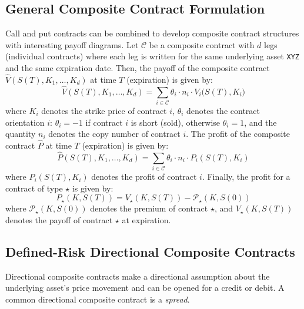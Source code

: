 \documentclass[11pt]{article}
\theoremstyle{definition}
\begin{document}
\subsection{General Composite Contract Formulation}
Call and put contracts can be combined to develop composite contract structures with interesting payoff diagrams. Let $\mathcal{C}$ be a composite contract with $d$ legs (individual contracts) where each leg is written for the same underlying asset \texttt{XYZ} and the same expiration date. 
Then, the payoff of the composite contract $\hat{V}(S(T),K_{1},\dots,K_{d})$ at time $T$ (expiration) is given by:
\begin{equation}
\hat{V}(S(T),K_{1},\dots,K_{d}) = \sum_{i\in\mathcal{C}}\theta_{i}\cdot{n_{i}}\cdot{V_{i}(S(T),K_{i}})
\end{equation}
where $K_{i}$ denotes the strike price of contract $i$, $\theta_{i}$ denotes the contract orientation $i$: $\theta_{i}=-1$ if contract $i$ is short (sold), 
otherwise $\theta_{i}=1$, and the quantity $n_{i}$ denotes the copy number of contract $i$.
The profit of the composite contract $\hat{P}$ at time $T$ (expiration) is given by:
\begin{equation}
\hat{P}(S(T),K_{1},\dots,K_{d}) = \sum_{i\in\mathcal{C}}\theta_{i}\cdot{n}_{i}\cdot{P}_{i}(S(T),K_{i})
\end{equation}
where $P_{i}(S(T),K_{i})$ denotes the profit of contract $i$. 
Finally, the profit for a contract of type $\star$ is given by:
\begin{equation}
P_{\star}(K,S(T)) = {V}_{\star}(K,S(T)) -  \mathcal{P}_{\star}(K,S(0))
\end{equation}
where $\mathcal{P}_{\star}(K,S(0))$ denotes the premium of contract $\star$, and ${V}_{\star}(K,S(T))$ 
denotes the payoff of contract $\star$ at expiration.

\subsection{Defined-Risk Directional Composite Contracts}
Directional composite contracts make a directional assumption about the underlying asset's price movement and can be opened for a credit or debit.
A common directional composite contract is a \textit{spread}.
\end{document}
